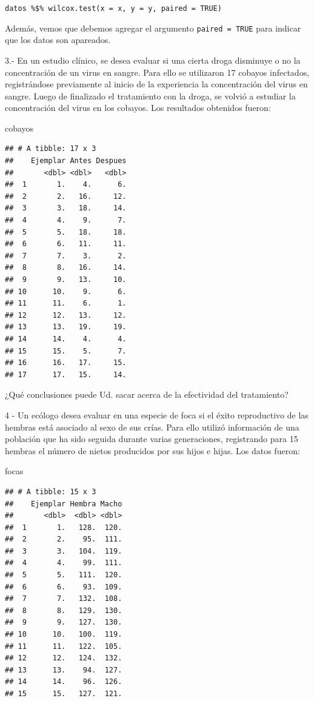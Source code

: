 \documentclass[]{book}
\newenvironment{Shaded}{\begin{snugshade}}{\end{snugshade}}
\newcommand{\NormalTok}[1]{#1}
\theoremstyle{definition}
\theoremstyle{definition}
\theoremstyle{definition}
\theoremstyle{remark}
\begin{document}
\texttt{datos\ \%\$\%\ wilcox.test(x\ =\ x,\ y\ =\ y,\ paired\ =\ TRUE)}

Además, vemos que debemos agregar el argumento \texttt{paired\ =\ TRUE}
para indicar que los datos son apareados.

3.- En un estudio clínico, se desea evaluar si una cierta droga
disminuye o no la concentración de un virus en sangre. Para ello se
utilizaron 17 cobayos infectados, registrándose previamente al inicio de
la experiencia la concentración del virus en sangre. Luego de finalizado
el tratamiento con la droga, se volvió a estudiar la concentración del
virus en los cobayos. Los resultados obtenidos fueron:

\begin{Shaded}
\begin{Highlighting}[]
\NormalTok{cobayos}
\end{Highlighting}
\end{Shaded}

\begin{verbatim}
## # A tibble: 17 x 3
##    Ejemplar Antes Despues
##       <dbl> <dbl>   <dbl>
##  1       1.    4.      6.
##  2       2.   16.     12.
##  3       3.   18.     14.
##  4       4.    9.      7.
##  5       5.   18.     18.
##  6       6.   11.     11.
##  7       7.    3.      2.
##  8       8.   16.     14.
##  9       9.   13.     10.
## 10      10.    9.      6.
## 11      11.    6.      1.
## 12      12.   13.     12.
## 13      13.   19.     19.
## 14      14.    4.      4.
## 15      15.    5.      7.
## 16      16.   17.     15.
## 17      17.   15.     14.
\end{verbatim}

¿Qué conclusiones puede Ud. sacar acerca de la efectividad del
tratamiento?

4 - Un ecólogo desea evaluar en una especie de foca si el éxito
reproductivo de las hembras está asociado al sexo de sus crías. Para
ello utilizó información de una población que ha sido seguida durante
varias generaciones, registrando para 15 hembras el número de nietos
producidos por sus hijos e hijas. Los datos fueron:

\begin{Shaded}
\begin{Highlighting}[]
\NormalTok{focas}
\end{Highlighting}
\end{Shaded}

\begin{verbatim}
## # A tibble: 15 x 3
##    Ejemplar Hembra Macho
##       <dbl>  <dbl> <dbl>
##  1       1.   128.  120.
##  2       2.    95.  111.
##  3       3.   104.  119.
##  4       4.    99.  111.
##  5       5.   111.  120.
##  6       6.    93.  109.
##  7       7.   132.  108.
##  8       8.   129.  130.
##  9       9.   127.  130.
## 10      10.   100.  119.
## 11      11.   122.  105.
## 12      12.   124.  132.
## 13      13.    94.  127.
## 14      14.    96.  126.
## 15      15.   127.  121.
\end{verbatim}
\end{document}
